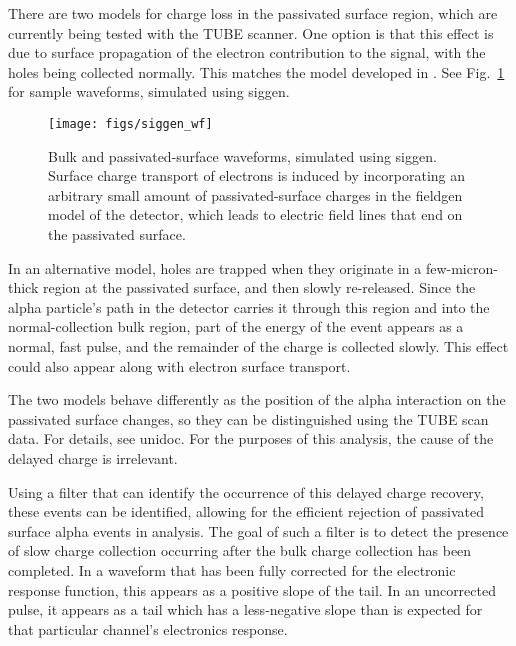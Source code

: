 \documentclass[groupedaddress,rmp,amsmath,amssymb,bibnotes,altaffilletter,twocolumn]{revtex4-1}
\begin{document}
There are two models for charge loss in the passivated surface region, which are currently being tested with the TUBE scanner. One option is that this effect is due to surface propagation of the electron contribution to the signal, with the holes being collected normally. This matches the model developed in \cite{Mullowney2012}. See Fig.~\ref{fig:siggen_wf} for sample waveforms, simulated using siggen. 

\begin{figure}[h]
 \centering
 \texttt{[image: figs/siggen\_wf]}
 \caption{Bulk and passivated-surface waveforms, simulated using siggen. Surface charge transport of electrons is induced by incorporating an arbitrary small amount of passivated-surface charges in the fieldgen model of the detector, which leads to electric field lines that end on the passivated surface.} 
 \label{fig:siggen_wf}
\end{figure}

In an alternative model, holes are trapped when they originate in a few-micron-thick region at the passivated surface, and then slowly re-released. Since the alpha particle's path in the detector carries it through this region and into the normal-collection bulk region, part of the energy of the event appears as a normal, fast pulse, and the remainder of the charge is collected slowly. This effect could also appear along with electron surface transport. 

The two models behave differently as the position of the alpha interaction on the passivated surface changes, so they can be distinguished using the TUBE scan data. For details, see unidoc. For the purposes of this analysis, the cause of the delayed charge is irrelevant. 

Using a filter that can identify the occurrence of this delayed charge recovery, these events can be identified, allowing for the efficient rejection of passivated surface alpha events in analysis. The goal of such a filter is to detect the presence of slow charge collection occurring after the bulk charge collection has been completed. In a waveform that has been fully corrected for the electronic response function, this appears as a positive slope of the tail. In an uncorrected pulse, it appears as a tail which has a less-negative slope than is expected for that particular channel's electronics response. 

\end{document}
